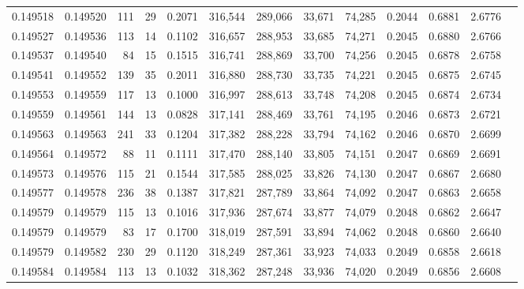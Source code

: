 \begin{tabular}{rrrrrrrrrrrrr}
0.149518 & 0.149520 &   111 &  29 &                                     0.2071 & 316,544 & 289,066 &  33,671 &  74,285 & 0.2044 & 0.6881 & 2.6776 \\
0.149527 & 0.149536 &   113 &  14 &                                     0.1102 & 316,657 & 288,953 &  33,685 &  74,271 & 0.2045 & 0.6880 & 2.6766 \\
0.149537 & 0.149540 &    84 &  15 &                                     0.1515 & 316,741 & 288,869 &  33,700 &  74,256 & 0.2045 & 0.6878 & 2.6758 \\
0.149541 & 0.149552 &   139 &  35 &                                     0.2011 & 316,880 & 288,730 &  33,735 &  74,221 & 0.2045 & 0.6875 & 2.6745 \\
0.149553 & 0.149559 &   117 &  13 &                                     0.1000 & 316,997 & 288,613 &  33,748 &  74,208 & 0.2045 & 0.6874 & 2.6734 \\
0.149559 & 0.149561 &   144 &  13 &                                     0.0828 & 317,141 & 288,469 &  33,761 &  74,195 & 0.2046 & 0.6873 & 2.6721 \\
0.149563 & 0.149563 &   241 &  33 &                                     0.1204 & 317,382 & 288,228 &  33,794 &  74,162 & 0.2046 & 0.6870 & 2.6699 \\
0.149564 & 0.149572 &    88 &  11 &                                     0.1111 & 317,470 & 288,140 &  33,805 &  74,151 & 0.2047 & 0.6869 & 2.6691 \\
0.149573 & 0.149576 &   115 &  21 &                                     0.1544 & 317,585 & 288,025 &  33,826 &  74,130 & 0.2047 & 0.6867 & 2.6680 \\
0.149577 & 0.149578 &   236 &  38 &                                     0.1387 & 317,821 & 287,789 &  33,864 &  74,092 & 0.2047 & 0.6863 & 2.6658 \\
0.149579 & 0.149579 &   115 &  13 &                                     0.1016 & 317,936 & 287,674 &  33,877 &  74,079 & 0.2048 & 0.6862 & 2.6647 \\
0.149579 & 0.149579 &    83 &  17 &                                     0.1700 & 318,019 & 287,591 &  33,894 &  74,062 & 0.2048 & 0.6860 & 2.6640 \\
0.149579 & 0.149582 &   230 &  29 &                                     0.1120 & 318,249 & 287,361 &  33,923 &  74,033 & 0.2049 & 0.6858 & 2.6618 \\
0.149584 & 0.149584 &   113 &  13 &                                     0.1032 & 318,362 & 287,248 &  33,936 &  74,020 & 0.2049 & 0.6856 & 2.6608 \\

\end{tabular}
